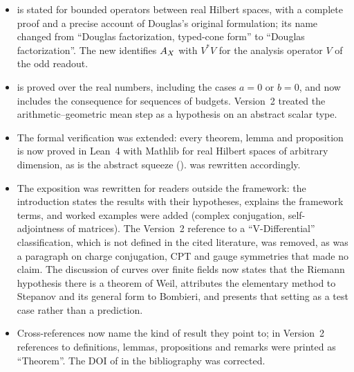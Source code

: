 \begin{itemize}
    state the consequences: the theorem does not make confinement
    easier to prove, its role is to fix the form of a bridge argument,
    and SDTC cannot hold for all involutive ledgers (the
    complex-conjugation example is a counterexample).  Version~2 did
    not state the converse or these consequences.
  \item {} is stated for
    bounded operators between real Hilbert spaces, with a complete proof
    and a precise account of Douglas's original formulation; its name
    changed from ``Douglas factorization, typed-cone form'' to
    ``Douglas factorization''.  The new
     identifies \(A_{X}\)
    with \(V^*V\) for the analysis operator \(V\) of the odd readout.
  \item {} is proved
    over the real numbers, including the cases \(a=0\) or \(b=0\), and
    now includes the consequence for sequences of budgets.  Version~2
    treated the arithmetic--geometric mean step as a hypothesis on an
    abstract scalar type.
  \item The formal verification was extended: every theorem, lemma
    and proposition is now proved in Lean~4 with Mathlib for real Hilbert
    spaces of arbitrary dimension, as is the abstract squeeze
    ().
     was rewritten accordingly.
  \item The exposition was rewritten for readers outside the framework:
    the introduction states the results with their hypotheses,
     explains the framework terms, and worked
    examples were added (complex conjugation, self-adjointness of
    matrices).  The Version~2 reference to a ``V-Differential''
    classification, which is not defined in the cited literature, was
    removed, as was a paragraph on charge conjugation, CPT and gauge
    symmetries that made no claim.  The discussion of curves over finite
    fields now states
    that the Riemann hypothesis there is a theorem of Weil, attributes
    the elementary method to Stepanov and its general form to Bombieri,
    and presents that setting as a test case rather than a prediction.
  \item Cross-references now name the kind of result they point to;
    in Version~2 references to definitions, lemmas, propositions and
    remarks were printed as ``Theorem''.  The DOI of
    \citet{Stepanov1969} in the bibliography was corrected.
\end{itemize}

